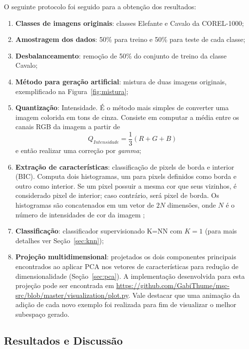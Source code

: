O seguinte protocolo foi seguido para a obtenção dos resultados:

\begin{enumerate}
\item \textbf{Classes de imagens originais}: classes Elefante e Cavalo da COREL-1000;
\item \textbf{Amostragem dos dados}: 50\% para treino e 50\% para teste de cada classe;
\item \textbf{Desbalanceamento}: remoção de 50\% do conjunto de treino da classe Cavalo;
\item \textbf{Método para geração artificial}: mistura de duas imagens originais, exemplificado na Figura~\ref{fig:mistura};
\item \textbf{Quantização}: Intensidade. É o método mais simples de converter uma imagem colorida em tons de cinza. Consiste em computar a média entre os canais RGB da imagem a partir de
\begin{equation}
	Q_{Intensidade} = \frac{1}{3}(R + G + B)
\end{equation}
\noindent e então realizar uma correção por \textit{gamma};
\item \textbf{Extração de características}: classificação de pixels de borda e interior (BIC). Computa dois histogramas, um para pixels definidos como borda e outro como interior. Se um pixel possuir a mesma cor que seus vizinhos, é considerado pixel de interior; caso contrário, será pixel de borda. Os histogramas são concatenados em um vetor de $2N$ dimensões, onde $N$ é o número de intensidades de cor da imagem \cite{bic};
\item \textbf{Classificação}: classificador supervisionado K=NN com $K = 1$ (para mais detalhes ver Seção~\ref{sec:knn});
\item \textbf{Projeção multidimensional}: projetados os dois componentes principais encontrados ao aplicar PCA nos vetores de características para redução de dimensionalidade (Seção~\ref{sec:pca}). A implementação desenvolvida para esta projeção pode ser encontrada em \url{https://github.com/GabiThume/msc-src/blob/master/visualization/plot.py}. Vale destacar que uma animação da adição de cada novo exemplo foi realizada para fim de visualizar o melhor subespaço gerado.
\end{enumerate}
\subsection{Resultados e Discussão}

